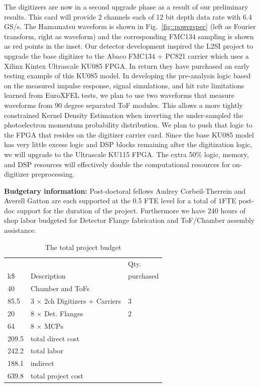 \documentclass[aps]{revtex4}
\begin{document}
The digitizers are now in a second upgrade phase as a result of our preliminary results.
This card will provide 2 channels each of 12 bit depth data rate with 6.4 GS/s.
The Hamamatsu waveform is shown in Fig.~\ref{fig::powerspec} (left as Fourier transform, right as waveform) and the corresponding FMC134 sampling is shown as red points in the inset.
Our detector development inspired the L2SI project to upgrade the base digitizer to the Abaco FMC134 + PC821 carrier which uses a Xilinx Kintex Ultrascale KU085 FPGA.  
In return they have purchased an early testing example of this KU085 model.
In developing the pre-analysis logic based on the measured impulse response, signal simulations, and hit rate limitations learned from EuroXFEL tests, we plan to use two waveforms that measure waveforms from 90 degree separated ToF modules.
This allows a more tightly constrained Kernel Density Estimation when inverting the under-sampled the photoelectron momentum probability distribution.
We plan to push that logic to the FPGA that resides on the digitizer carrier card.
Since the base KU085 model has very little excess logic and DSP blocks remaining after the digitization logic, we will upgrade to the Ultrascale KU115 FPGA.
The extra 50\% logic, memory, and DSP resources will effectively double the computational resources for on-digitizer preprocessing.



\textbf{Budgetary information: }
Post-doctoral fellows Audrey Corbeil-Therrein and Averell Gatton are each supported at the 0.5 FTE level for a total of 1FTE post-doc support for the duration of the project.
Furthermore we have 240 hours of shop labor budgeted for Detector Flange fabrication and ToF/Chamber assembly assistance.
\begin{table}
\caption{\label{tab::budget}
The total project budget
}
\begin{tabular}{|lll|}
\hline
&&Qty.\\
k\$ & Description & purchased\\
\hline
40 	& Chamber and ToFs	& \\
85.5 	& 3 $\times$ 2ch Digitizers + Carriers	& 3\\
20 	& 8 $\times$ Det. Flanges	& 2\\
64 	& 8 $\times$ MCPs	& \\
\hline
209.5 	& total direct cost	&\\
242.2	& total labor	&\\
188.1	& indirect	&\\
\hline
\hline
639.8	& total project cost &\\
\hline
\end{tabular}
\end{table}
\end{document}

